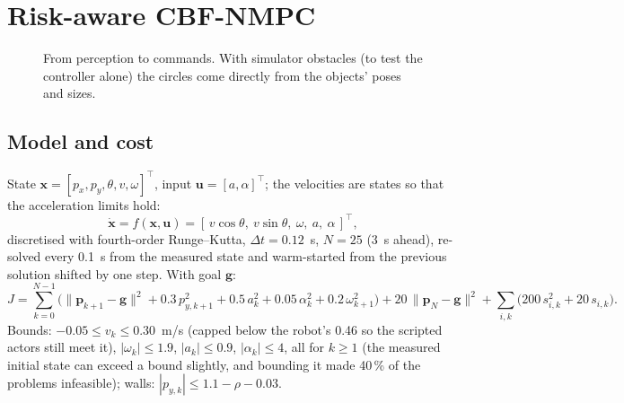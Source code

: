\documentclass[10pt,a4paper]{article}
\begin{document}
\section{Risk-aware CBF-NMPC}

\begin{figure}[H]
\centering
{}
\caption{From perception to commands. With simulator obstacles (to test the controller alone) the circles come directly from the
objects' poses and sizes.}
\end{figure}

\subsection{Model and cost}
State $\bm x=[p_x,p_y,\theta,v,\omega]^\top$, input $\bm u=[a,\alpha]^\top$; the velocities are states so that the acceleration
limits hold:
\begin{equation}
\dot{\bm x} = f(\bm x,\bm u) = [\,v\cos\theta,\ v\sin\theta,\ \omega,\ a,\ \alpha\,]^\top,
\end{equation}
discretised with fourth-order Runge--Kutta, $\Delta t=0.12$~s, $N=25$ (3~s ahead), re-solved every 0.1~s from the measured state
and warm-started from the previous solution shifted by one step. With goal $\bm g$:
\begin{equation}
J=\sum_{k=0}^{N-1}\Big(\|\bm p_{k+1}-\bm g\|^2 + 0.3\,p_{y,k+1}^2 + 0.5\,a_k^2 + 0.05\,\alpha_k^2 + 0.2\,\omega_{k+1}^2\Big)
+ 20\,\|\bm p_N-\bm g\|^2 + \sum_{i,k}\big(200\,s_{i,k}^2 + 20\,s_{i,k}\big).
\end{equation}
Bounds: $-0.05\leq v_k\leq0.30$~m/s (capped below the robot's 0.46 so the scripted actors still meet it), $|\omega_k|\leq1.9$,
$|a_k|\leq0.9$, $|\alpha_k|\leq4$, all for $k\geq1$ (the measured initial state can exceed a bound slightly, and bounding it made
40\,\% of the problems infeasible); walls: $|p_{y,k}|\leq1.1-\rho-0.03$.
\end{document}
